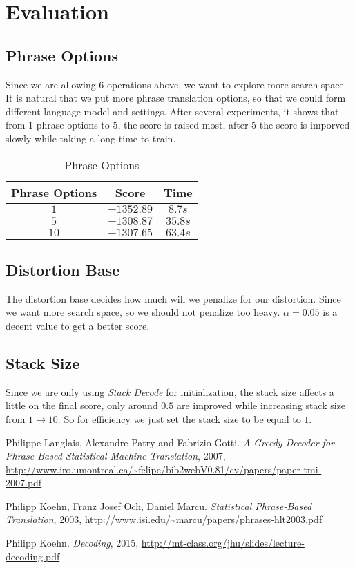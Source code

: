 \documentclass[11pt]{article}
\begin{document}
\section{Evaluation} %
\label{sec:evaluation}
\subsection{Phrase Options} %
\label{sub:phrase_options}
Since we are allowing $6$ operations above, we want to explore more search space. It is natural that we put more phrase translation options, so that we could form different language model and settings. After several experiments, it shows that from $1$ phrase options to $5$, the score is raised most, after $5$ the score is imporved slowly while taking a long time to train.
\begin{table}[!htf]
\centering
\begin{tabular}{ | c | c | c |}
\hline
Phrase Options & Score & Time \\
\hline
$1$ & $-1352.89$ & $8.7s$ \\
\hline
$5$ & $-1308.87$ & $35.8s$\\
\hline
$10$ & $-1307.65$ & $63.4s$\\
\hline
\end{tabular}
\caption{Phrase Options}
\end{table}
\subsection{Distortion Base} %
\label{sub:distortion_base}
The distortion base decides how much will we penalize for our distortion. Since we want more search space, so we should not penalize too heavy. $\alpha = 0.05$ is a decent value to get a better score.

\subsection{Stack Size} %
\label{sub:stack_size}
Since we are only using \textit{Stack Decode} for initialization, the stack size affects a little on the final score, only around $0.5$ are improved while increasing stack size from $1 \to 10$. So for efficiency we just set the stack size to be equal to $1$.
\begin{thebibliography}{50}
 Philippe Langlais, Alexandre Patry and Fabrizio Gotti. \textsl{A Greedy Decoder for Phrase-Based Statistical Machine Translation}, 2007, \url{http://www.iro.umontreal.ca/~felipe/bib2webV0.81/cv/papers/paper-tmi-2007.pdf}

 Philipp Koehn, Franz Josef Och, Daniel Marcu. \textsl{Statistical Phrase-Based Translation}, 2003, \url{http://www.isi.edu/~marcu/papers/phrases-hlt2003.pdf}

 Philipp Koehn. \textsl{Decoding}, 2015, \url{http://mt-class.org/jhu/slides/lecture-decoding.pdf}
\end{thebibliography}
\end{document}
